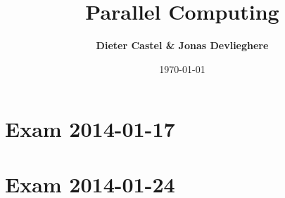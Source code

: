 \documentclass[a4paper, 10pt, oneside]{article}
\title{Parallel Computing}
\date{\today}
\author{\textbf{Dieter Castel \& Jonas Devlieghere}}
\theoremstyle{definition}
\begin{document}
\maketitle
\newpage

\tableofcontents
\newpage

\section{Exam 2014-01-17}


\newpage
\section{Exam 2014-01-24}


\newpage
\appendix
\printbibliography
\end{document}
